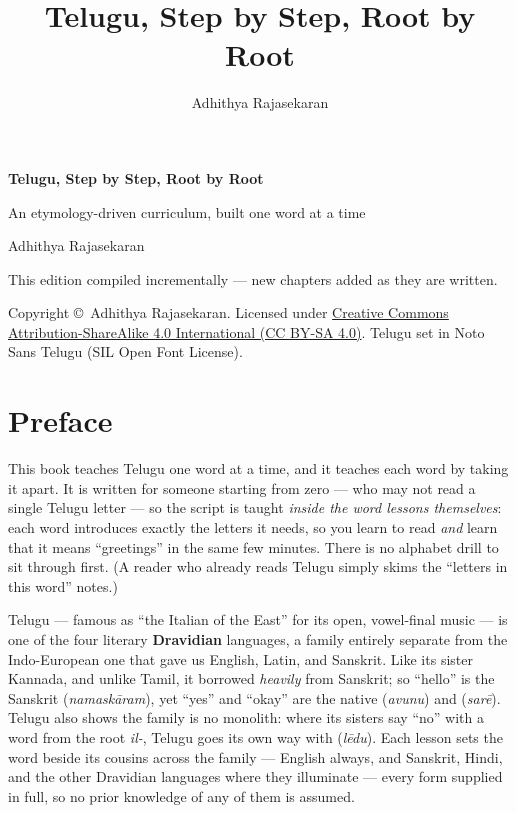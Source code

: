 \documentclass[11pt,twoside]{book}
\title{\Huge Telugu, Step by Step, Root by Root}
\author{Adhithya Rajasekaran}
\date{}
\begin{document}
\frontmatter

\begin{titlepage}
  \centering
  \vspace*{3cm}
  {\Huge\bfseries Telugu, Step by Step, Root by Root\par}
  \vspace{1cm}
  {\Large An etymology-driven curriculum, built one word at a time\par}
  \vspace{1.5cm}
  {\large Adhithya Rajasekaran\par}
  \vfill
  {\large This edition compiled incrementally --- new chapters added as they
  are written.\par}
  \vspace{2cm}
  {\normalsize
    Copyright \copyright\ Adhithya Rajasekaran. Licensed under
    \href{https://creativecommons.org/licenses/by-sa/4.0/}%
    {Creative Commons Attribution-ShareAlike 4.0 International (CC BY-SA 4.0)}.
    Telugu set in Noto Sans Telugu (SIL Open Font License).\par
  }
\end{titlepage}

\chapter*{Preface}

This book teaches Telugu one word at a time, and it teaches each word by taking
it apart. It is written for someone starting from zero --- who may not read a
single Telugu letter --- so the script is taught \emph{inside the word lessons
themselves}: each word
introduces exactly the letters it needs, so you learn to read 
\emph{and} learn that it means ``greetings'' in the same few minutes. There is
no alphabet drill to sit through first. (A reader who already reads Telugu
simply skims the ``letters in this word'' notes.)

Telugu --- famous as ``the Italian of the East'' for its open, vowel-final
music --- is one of the four literary \textbf{Dravidian} languages, a family
entirely separate from the Indo-European one that gave us English, Latin, and
Sanskrit. Like its sister Kannada, and unlike Tamil, it borrowed \emph{heavily}
from Sanskrit; so ``hello'' is the Sanskrit  (\emph{namaskāram}),
yet ``yes'' and ``okay'' are the native  (\emph{avunu}) and 
(\emph{sarē}). Telugu also shows the family is no monolith: where its sisters
say ``no'' with a word from the root \emph{il-}, Telugu goes its own way with
 (\emph{lēdu}). Each lesson sets the word beside its cousins across
the family --- English always, and Sanskrit, Hindi, and the other Dravidian
languages where they illuminate --- every form supplied in full, so no prior
knowledge of any of them is assumed.
\end{document}
